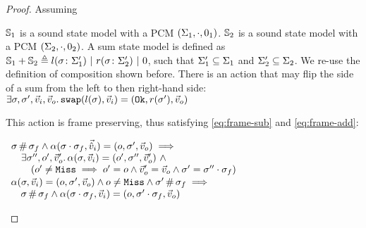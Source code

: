 \begin{proof}


Assuming 
\begin{hypvlist}
 $\mathbb S_1$ is a sound state model with a PCM $(\Sigma_1, \cdot, 0_1)$.
 $\mathbb S_2$ is a sound state model with a PCM $(\Sigma_2, \cdot, 0_2)$.
 A sum state model is defined as $\mathbb S_1 + \mathbb S_2 \triangleq l(\sigma\colon \Sigma_1') ~|~ r(\sigma\colon \Sigma_2') ~|~ 0$, such that $\Sigma_1'\subseteq \Sigma_1$ and $\Sigma_2'\subseteq \Sigma_2$. We re-use the definition of composition shown before.
 There is an action \swap{} that may flip the side of a sum from the left to then right-hand side: $\exists\sigma,\sigma',\vec{v}_i,\vec{v}_o\ldotp \texttt{swap}(l(\sigma),\vec{v}_i)=(\texttt{Ok},r(\sigma'),\vec{v}_o)$
\end{hypvlist}

This \swap{} action is frame preserving, thus satisfying \ref{eq:frame-sub} and \ref{eq:frame-add}:
\begin{hypvlist}
	 $\begin{array}{l}
\sigma\operatorname{\#}\sigma_f \land \alpha(\sigma\cdot\sigma_f,\vec{\hat{v}}_i)=(o, \sigma',\vec{v}_o) \implies \\
\quad\exists \sigma'', o', \vec{v}_o'\ldotp \alpha(\sigma,\vec{v}_i)=(o', \sigma'', \vec{v}_o') ~\land \\
\qquad(o' \neq \texttt{Miss} \implies o' = o \land  \vec{v}_o' = \vec{v}_o \land \sigma' = \sigma'' \cdot \sigma_f)
	\end{array}$
	 $\begin{array}{l}
\alpha(\sigma,\vec{v}_i)=(o, \sigma', \vec{v}_o) \land o \neq \texttt{Miss} \land \sigma'\operatorname{\#}\sigma_f\implies\\
\quad\sigma \operatorname{\#} \sigma_f \land \alpha(\sigma\cdot\sigma_f, \vec{v}_i)=(o, \sigma'\cdot\sigma_f, \vec{v}_o)
	\end{array}$
\end{hypvlist}
	

\end{proof}
